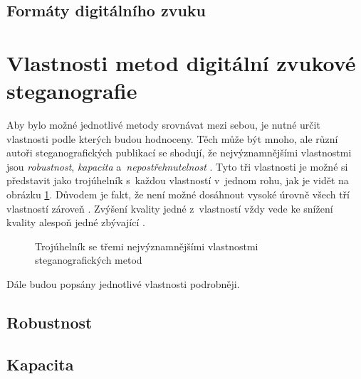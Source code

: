 \subsection*{Formáty digitálního zvuku}

\blindtext

\section{Vlastnosti metod digitální zvukové steganografie}
\label{sec:method-properties}

Aby bylo možné jednotlivé metody srovnávat mezi sebou, je nutné určit
vlastnosti podle kterých budou hodnoceny. Těch může být mnoho, ale různí autoři
steganografických publikací se shodují, že nejvýznamnějšími vlastnostmi jsou
\textit{robustnost}, \textit{kapacita} a~\textit{nepostřehnutelnost}
\cite{AlSabhany2020}\cite{Djebbar2012}\cite{Dutta2020}. Tyto tři vlastnosti je
možné si představit jako trojúhelník s~každou vlastností v~jednom rohu, jak je
vidět na obrázku \ref{pic:method-property-triangle}. Důvodem je fakt, že není
možné dosáhnout vysoké úrovně všech tří vlastností zároveň \cite{Dutta2020}.
Zvýšení kvality jedné z~vlastností vždy vede ke snížení kvality alespoň jedné
zbývající \cite{AlSabhany2020}\cite{Djebbar2012}.

\begin{figure}[hbt]
    \centering
    \caption{Trojúhelník se třemi nejvýznamnějšími vlastnostmi
    steganografických metod}
    \label{pic:method-property-triangle}
\end{figure}

Dále budou popsány jednotlivé vlastnosti podrobněji.

\subsection*{Robustnost}
\label{sub:robustness}

\blindtext

\subsection*{Kapacita}
\label{sub:capacity}

